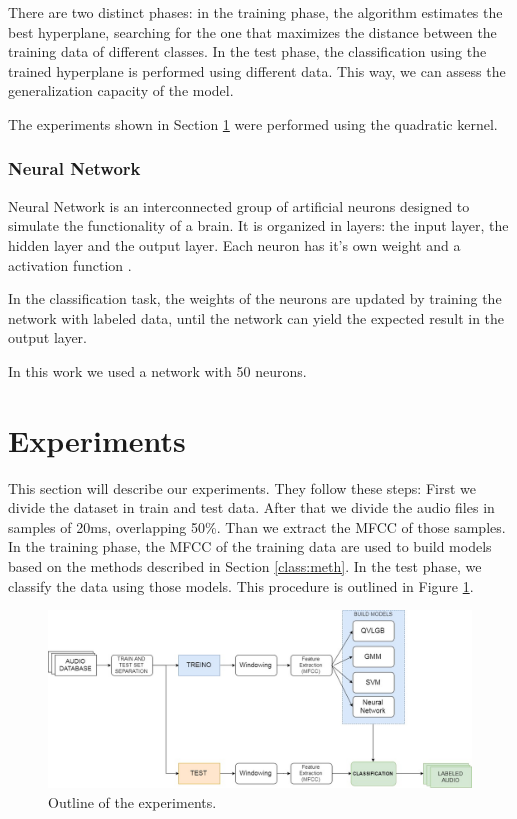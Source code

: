 \documentclass[12pt]{article}
\begin{document}
There are two distinct phases: in the training phase, the algorithm estimates the best hyperplane, searching for the one that maximizes the distance between the training data of different classes. In the test phase, the classification using the trained hyperplane is performed using different data. This way, we can assess the generalization capacity of the model.

The experiments shown in Section \ref{exp} were performed using the quadratic kernel.%


\subsubsection{Neural Network} \label{class:nn}


Neural Network is an interconnected group of artificial neurons designed to simulate the functionality of a brain. It is organized in layers: the input layer, the hidden layer and the output layer. Each neuron has it's own weight and a activation function \cite{wu2007leaf}. 

In the classification task, the weights of the neurons are updated by training the network with labeled data, until the network can yield the expected result in the output layer.

In this work we used a network with 50 neurons.%


\section{Experiments} \label{exp}

This section will describe our experiments. They follow these steps: First we divide the dataset in train and test data. After that we divide the audio files in samples of 20ms, overlapping 50\%. Than we extract the MFCC of those samples. In the training phase, the MFCC of the training data are used to build models based on the methods described in Section \ref{class:meth}. In the test phase, we classify the data using those models. This procedure is outlined in Figure \ref{fig:exp}.

\begin{figure}[ht]
\centering
\includegraphics[width=\textwidth]{diagrama_artigo.jpg}
\caption{Outline of the experiments.}
\label{fig:exp}
\end{figure}
\end{document}
